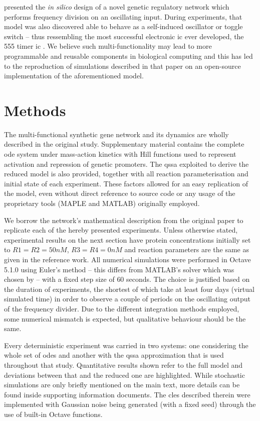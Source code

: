   \citet{multif} presented the \textit{in silico} design of a novel genetic regulatory network which performs frequency division on an oscillating input.
  During experiments, that model was also discovered able to behave as a self-induced oscillator or toggle switch -- thus ressembling the most successful electronic \ac{ic} ever developed, the 555 timer \acs{ic} \cite{ic555}.
  We believe such multi-functionality may lead to more programmable and reusable components in biological computing and this has led to the reproduction of simulations described in that paper on an open-source implementation of the aforementioned model.


\section{Methods}

  The multi-functional synthetic gene network and its dynamics are wholly described in the original study.
  Supplementary material contains the complete \ac{ode} system under mass-action kinetics with Hill functions used to represent activation and repression of genetic promoters.
  The \ac{qssa} exploited to derive the reduced model is also provided, together with all reaction parameterisation and initial state of each experiment.
  These factors allowed for an easy replication of the model, even without direct reference to source code or any usage of the proprietary tools (MAPLE and MATLAB) originally employed.

  We borrow the network's mathematical description from the original paper to replicate each of the hereby presented experiments.
  Unless otherwise stated, experimental results on the next section have protein concentrations initially set to $R1 = R2 = 50nM$, $R3 = R4 = 0nM$ and reaction parameters are the same as given in the reference work.
  All numerical simulations were performed in Octave 5.1.0 using Euler's method -- this differs from MATLAB's  solver which was chosen by \citet{multif} -- with a fixed step size of $60$ seconds.
  The choice is justified based on the duration of experiments, the shortest of which take at least four days (virtual simulated time) in order to observe a couple of periods on the oscillating output of the frequency divider.
  Due to the different integration methods employed, some numerical mismatch is expected, but qualitative behaviour should be the same.

  Every deterministic experiment was carried in two systems: one considering the whole set of \ac{ode}s and another with the \ac{qssa} approximation that is used throughout that study.
  Quantitative results shown refer to the full model and deviations between that and the reduced one are highlighted.
  While stochastic simulations are only briefly mentioned on the main text, more details can be found inside supporting information documents.
  The \ac{cles} described therein were implemented with Gaussian noise being generated (with a fixed seed) through the use of built-in Octave functions.



